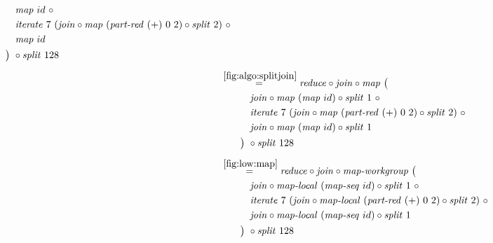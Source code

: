 \begin{align*}
\begin{aligned}
    &\qquad\quad\map\ id\ \circ \\
    &\qquad\quad\iterateN\ 7\ (\join \circ \map\ (\partRed\ (+)\ 0\ 2) \circ \splitN\ 2)\ \circ\\
    &\qquad\quad\map\ id\\
    &\qquad\big)\ \circ \splitN\ 128
  \end{aligned}\\[.5em]
%
  &\hspace{-2em}\quad\begin{aligned}
    &\overset{\ref{fig:algo:splitjoin}}{=\hspace{.2em}}
      \reduce \circ \join \circ \map\ \big(\\
    &\qquad\quad\join \circ \map\ (\map\ id) \circ \splitN\ 1\ \circ\\
    &\qquad\quad\iterateN\ 7\ (\join \circ \map\ (\partRed\ (+)\ 0\ 2) \circ \splitN\ 2)\ \circ\\
    &\qquad\quad\join \circ \map\ (\map\ id) \circ \splitN\ 1\\
    &\qquad\big)\ \circ \splitN\ 128
  \end{aligned}\\[.5em]
%
  &\hspace{-2em}\quad\begin{aligned}
    &\overset{\ref{fig:low:map}}{=\hspace{.2em}}
      \reduce \circ \join \circ \mapWorkgroup\ \big(\\
    &\qquad\quad\join \circ \mapLocal\ (\mapSeq\ id) \circ \splitN\ 1\ \circ\\
    &\qquad\quad\iterateN\ 7\ (\join \circ \mapLocal\ (\partRed\ (+)\ 0\ 2) \circ \splitN\ 2)\ \circ\\
    &\qquad\quad\join \circ \mapLocal\ (\mapSeq\ id) \circ \splitN\ 1\\
    &\qquad\big)\ \circ \splitN\ 128
  \end{aligned}\\[.5em]
\end{align*}

